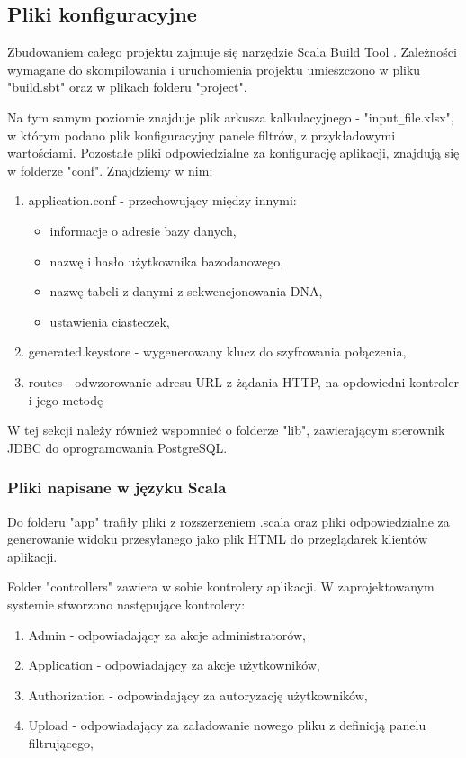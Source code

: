 \documentclass[a4paper,12pt,twoside]{article}
\begin{document}
\subsection{Pliki konfiguracyjne}

Zbudowaniem całego projektu zajmuje się narzędzie Scala Build Tool \cite{sbt}.
Zależności wymagane do skompilowania i uruchomienia projektu
umieszczono w pliku "build.sbt" oraz w plikach folderu "project".

Na tym samym poziomie znajduje plik arkusza kalkulacyjnego - 
"input\verb!_!file.xlsx", w którym podano plik konfiguracyjny panele filtrów,
z przykładowymi wartościami.
Pozostałe pliki odpowiedzialne za konfigurację aplikacji, znajdują
się w folderze "conf". 
Znajdziemy w nim:
\begin{enumerate}[1)]
\item application.conf - przechowujący między innymi:
\begin{itemize}
\item informacje o adresie bazy danych,
\item nazwę i hasło użytkownika bazodanowego,
\item nazwę tabeli z danymi z sekwencjonowania DNA,
\item ustawienia ciasteczek,
\end{itemize}
\item generated.keystore - wygenerowany klucz do szyfrowania połączenia,
\item routes - odwzorowanie adresu URL z żądania HTTP, na opdowiedni kontroler 
i jego  metodę 
\end{enumerate}

W tej sekcji należy również wspomnieć o folderze "lib", zawierającym
sterownik JDBC do oprogramowania PostgreSQL.

\newpage
\subsubsection{Pliki napisane w języku Scala}
Do folderu "app" trafiły pliki z rozszerzeniem .scala oraz pliki
odpowiedzialne za generowanie widoku przesyłanego jako plik HTML do
przeglądarek klientów aplikacji.

Folder "controllers" zawiera w sobie kontrolery aplikacji.
W zaprojektowanym systemie stworzono następujące kontrolery:
\begin{enumerate}[1)]
\item Admin - odpowiadający za akcje administratorów,
\item Application - odpowiadający za akcje użytkowników,
\item Authorization - odpowiadający za autoryzację użytkowników,
\item Upload - odpowiadający za załadowanie nowego pliku z definicją panelu filtrującego,
\end{enumerate}
\end{document}

